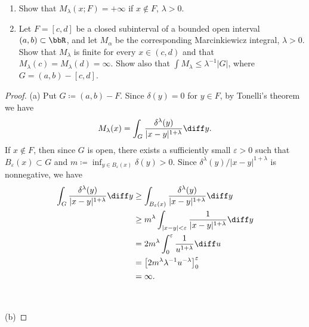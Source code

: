 \begin{problem}
\begin{enumerate}[label=(\alph*)]
\item Show that $M_\lambda(x;F)=+\infty$ if $x\notin F$, $\lambda>0$.
\item Let $F=[c,d]$ be a closed subinterval of a bounded open interval
  $(a,b)\subset\bbR$, and let $M_\alpha$ be the corresponding
  Marcinkiewicz integral, $\lambda>0$. Show that $M_\lambda$ is finite for
  every $x\in(c,d)$ and that $M_\lambda(c)=M_\lambda(d)=\infty$. Show also
  that $\int M_\lambda\leq\lambda^{-1}|G|$, where $G=(a,b)-[c,d]$.
\end{enumerate}
\end{problem}
\begin{proof}
(a) Put $G\coloneqq(a,b)\minus F$. Since $\delta(y)=0$ for $y\in F$, by
Tonelli's theorem we have
\begin{equation}
  \label{eq:application-of-tonelli-2}
M_\lambda(x)=\int_G\frac{\delta^\lambda(y)}{|x-y|^{1+\lambda}}\diff y.
\end{equation}
If $x\notin F$, then since $G$ is open, there exists a sufficiently small
$\varepsilon>0$ such that $B_\varepsilon(x)\subset G$ and
$m\coloneqq\inf_{y\in B_\varepsilon(x)}\delta(y)>0$. Since
$\delta^\lambda(y)/|x-y|^{1+\lambda}$ is nonnegative, we have
\begin{align*}
\int_G\frac{\delta^\lambda(y)}{|x-y|^{1+\lambda}}\diff y
&\geq
  \int_{B_\varepsilon(x)}\frac{\delta^\lambda(y)}{|x-y|^{1+\lambda}}\diff
  y\\
&\geq m^\lambda\int_{|x-y|<\varepsilon}\frac{1}{|x-y|^{1+\lambda}}\diff y\\
&=2m^\lambda\int_0^\varepsilon\frac{1}{u^{1+\lambda}}\diff u\\
&=\left[2m^\lambda\lambda^{-1}u^{-\lambda}\right]_0^\varepsilon\\
&=\infty.
\end{align*}
\\\\
(b)
\end{proof}

